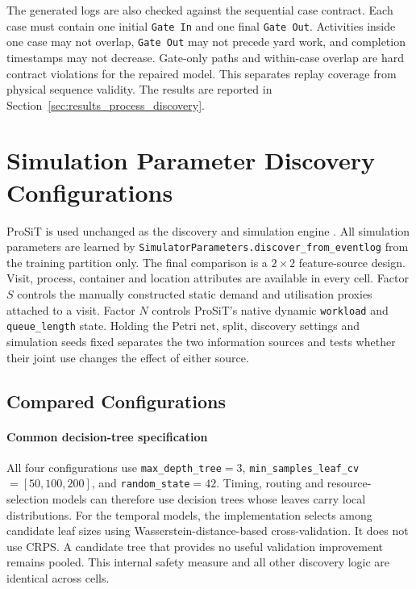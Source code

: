 The generated logs are also checked against the sequential case contract. Each
case must contain one initial \texttt{Gate In} and one final \texttt{Gate Out}.
Activities inside one case may not overlap, \texttt{Gate Out} may not precede
yard work, and completion timestamps may not decrease. Gate-only paths and
within-case overlap are hard contract violations for the repaired model. This
separates replay coverage from physical sequence validity. The results are
reported in Section~\ref{sec:results_process_discovery}.

\section{Simulation Parameter Discovery Configurations}
\label{sec:simulation_discovery_methodology}

ProSiT is used unchanged as the discovery and simulation engine
\cite{Vinci2026prosit}. All simulation parameters are learned by
\texttt{SimulatorParameters.discover\_from\_eventlog} from the training
partition only. The final comparison is a $2\times2$ feature-source design.
Visit, process, container and location attributes are available in every
cell. Factor $S$ controls the manually constructed static demand and
utilisation proxies attached to a visit. Factor $N$ controls ProSiT's native
dynamic \texttt{workload} and \texttt{queue\_length} state. Holding the Petri
net, split, discovery settings and simulation seeds fixed separates the two
information sources and tests whether their joint use changes the effect of
either source.

\subsection{Compared Configurations}
\paragraph{Common decision-tree specification}

All four configurations use \texttt{max\_depth\_tree}$=3$,
\texttt{min\_samples\_leaf\_cv}$=[50,100,200]$, and
\texttt{random\_state}$=42$. Timing, routing and resource-selection models can
therefore use decision trees whose leaves carry local distributions. For the
temporal models, the implementation selects among candidate leaf sizes using
Wasserstein-distance-based cross-validation. It does not use CRPS. A candidate
tree that provides no useful validation improvement remains pooled. This
internal safety measure and all other discovery logic are identical across cells.

